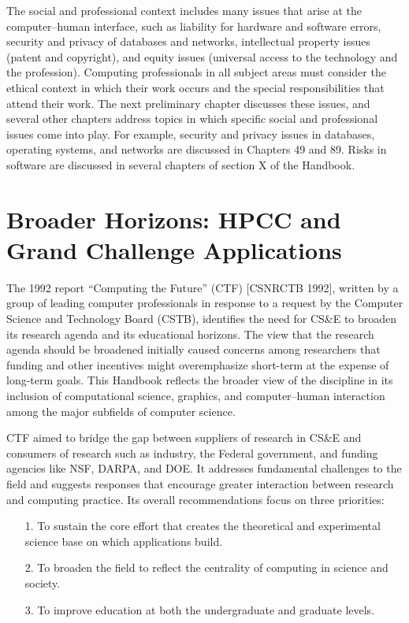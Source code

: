 The social and professional context includes many issues that
arise at the computer--human interface, such as liability for
hardware and software errors, security and privacy of databases
and networks, intellectual property issues (patent and
copyright), and equity issues (universal access to the
technology and the profession). Computing professionals in all
subject areas must consider the ethical context in which their
work occurs and the special responsibilities that attend their
work. The next preliminary chapter discusses these issues, and
several other chapters address topics in which specific social
and professional issues come into play. For example, security
and privacy issues in databases, operating systems, and networks
are discussed in Chapters 49 and 89. Risks in software are
discussed in several chapters of section X of the Handbook.

\section{Broader Horizons: HPCC and Grand Challenge Applications}

\noindent 
The 1992 report ``Computing the Future'' (CTF) [CSNRCTB 1992],
written by a group of leading computer professionals in response
to a request by the Computer Science and Technology Board
(CSTB), identifies the need for CS\&E to broaden its research
agenda and its educational horizons. The view that the research
agenda should be broadened initially caused concerns among
researchers that funding and other incentives might
overemphasize short-term at the expense of long-term goals. This
Handbook reflects the broader view of the discipline in its
inclusion of computational science, graphics, and computer--human
interaction among the major subfields of computer science.

CTF aimed to bridge the gap between suppliers of research in
CS\&E and consumers of research such as industry, the Federal
government, and funding agencies like NSF, DARPA, and DOE. It
addresses fundamental challenges to the field and suggests
responses that encourage greater interaction between research
and computing practice. Its overall recommendations focus on
three priorities:

\begin{enumerate}
\item[1.]
To sustain the core effort that creates the theoretical and
experimental science base on which applications build.

\item[2.]
To broaden the field to reflect the centrality of computing
in science and society.

\item[3.]
To improve education at both the undergraduate and graduate levels.
\end{enumerate}

